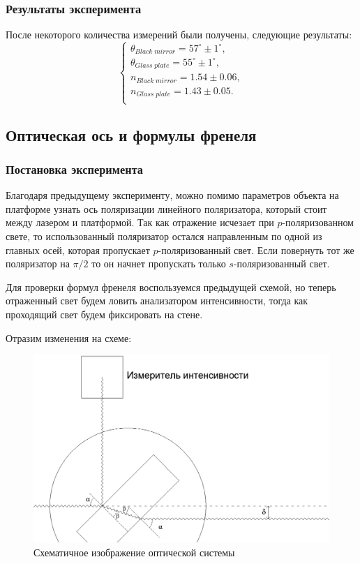 \documentclass[a4paper,14pt]{extarticle}
\begin{document}
			\subsubsection{Результаты эксперимента}
				После некоторого количества измерений были получены, следующие результаты: 
				\begin{equation}
					\begin{cases}
						\theta_{Black \; mirror} = 57^\circ \pm 1^\circ, \\
						\theta_{Glass \; plate} = 55^\circ \pm 1^\circ, \\
						n_{Black \; mirror} = 1.54 \pm 0.06, \\
						n_{Glass \; plate} = 1.43 \pm 0.05. \\
					\end{cases}
				\end{equation}
		\subsection{Оптическая ось и формулы френеля}
			\subsubsection{Постановка эксперимента}
				Благодаря предыдущему эксперименту, можно помимо параметров объекта на платформе узнать ось поляризации линейного поляризатора, который стоит между лазером и платформой. Так как отражение исчезает при $p$-поляризованном свете, то использованный поляризатор остался направленным по одной из главных осей, которая пропускает $p$-поляризованный свет. Если повернуть тот же поляризатор на $\pi/2 $ то он начнет пропускать только $s$-поляризованный свет.
			
				Для проверки формул френеля воспользуемся предыдущей схемой, но теперь отраженный свет будем ловить анализатором интенсивности, тогда как проходящий свет будем фиксировать на стене.
				
				Отразим изменения на схеме:
				
				\begin{figure}[h!]
					\centering
					\includegraphics[width=1\linewidth]{Frenele.png}
					\caption{Схематичное изображение оптической системы}
					\label{fig2}
				\end{figure}
				
\end{document}

